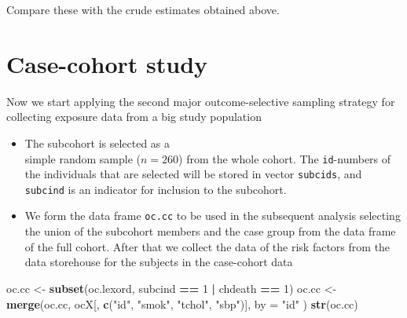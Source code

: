 \documentclass[
]{book}
\newenvironment{Shaded}{\begin{snugshade}}{\end{snugshade}}
\newcommand{\AttributeTok}[1]{\textcolor[rgb]{0.13,0.29,0.53}{#1}}
\newcommand{\DecValTok}[1]{\textcolor[rgb]{0.00,0.00,0.81}{#1}}
\newcommand{\FunctionTok}[1]{\textcolor[rgb]{0.13,0.29,0.53}{\textbf{#1}}}
\newcommand{\NormalTok}[1]{#1}
\newcommand{\OtherTok}[1]{\textcolor[rgb]{0.56,0.35,0.01}{#1}}
\newcommand{\SpecialCharTok}[1]{\textcolor[rgb]{0.81,0.36,0.00}{\textbf{#1}}}
\newcommand{\StringTok}[1]{\textcolor[rgb]{0.31,0.60,0.02}{#1}}
\providecommand{\tightlist}{%
  \setlength{\itemsep}{0pt}\setlength{\parskip}{0pt}}
\theoremstyle{definition}
\theoremstyle{definition}
\theoremstyle{definition}
\theoremstyle{definition}
\theoremstyle{remark}
\begin{document}
Compare these with the crude estimates obtained above.

\section{Case-cohort study}\label{case-cohort-study}

Now we start applying the second major outcome-selective
sampling strategy
for collecting exposure data from a big study population

\begin{itemize}
\tightlist
\item
  The subcohort is selected as a\\
  simple random sample (\(n=260\)) from the whole cohort.
  The \texttt{id}-numbers of the individuals that are
  selected will be stored in vector \texttt{subcids}, and
  \texttt{subcind} is an indicator for inclusion to the subcohort.
\end{itemize}

\begin{Shaded}
\end{Shaded}

\begin{itemize}
\tightlist
\item
  We form the data frame \texttt{oc.cc}
  to be used in the subsequent
  analysis selecting the union of the subcohort members
  and the case group from the data frame of the full cohort.
  After that we collect the data of the risk factors from the
  data storehouse for the subjects in the case-cohort data
\end{itemize}

\begin{Shaded}
\begin{Highlighting}[]
\NormalTok{oc.cc }\OtherTok{\textless{}{-}} \FunctionTok{subset}\NormalTok{(oc.lexord, subcind }\SpecialCharTok{==} \DecValTok{1} \SpecialCharTok{|}\NormalTok{ chdeath }\SpecialCharTok{==} \DecValTok{1}\NormalTok{)}
\NormalTok{oc.cc }\OtherTok{\textless{}{-}} \FunctionTok{merge}\NormalTok{(oc.cc, ocX[, }\FunctionTok{c}\NormalTok{(}\StringTok{"id"}\NormalTok{, }\StringTok{"smok"}\NormalTok{, }\StringTok{"tchol"}\NormalTok{, }\StringTok{"sbp"}\NormalTok{)],}
  \AttributeTok{by =} \StringTok{"id"}
\NormalTok{)}
\FunctionTok{str}\NormalTok{(oc.cc)}
\end{Highlighting}
\end{Shaded}
\end{document}
